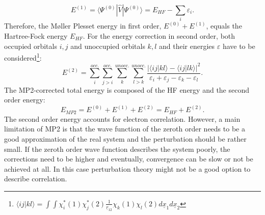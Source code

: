 \documentclass[11pt,DIV=13,BCOR=5mm,a4paper,headinclude]{scrbook}
\renewcommand{\vec}[1]{\underline{#1}}
\begin{document}
\begin{equation}
 E^{(1)} = \langle\Psi^{(0)}|\hat{V}|\Psi^{(0)}\rangle=E_{HF}-\sum_i \varepsilon_i.
\end{equation}
Therefore, the M\o{}ller Plesset energy in first order, $E^{(0)}+E^{(1)}$, equals the Hartree-Fock energy $E_{HF}$.
For the energy correction in second order, both occupied orbitals $i,j$ and unoccupied orbitals $k,l$ and their energies $\varepsilon$ have to be considered\footnote{$\langle ij|kl\rangle=\int\int\chi^\ast_i(1)\chi^\ast_j(2)\frac{1}{\vec{r}_{12}}\chi_k(1)\chi_l(2) d\vec{x}_1d\vec{x}_2$}:
\begin{equation}
 E^{(2)}=\sum\limits_{i}^{occ.}\sum\limits_{j>i}^{occ.}\sum\limits_{k}^{unocc.}\sum\limits_{l>k}^{unocc.} \frac{|\langle ij|kl\rangle - \langle ij|lk\rangle|^2}{\varepsilon_i + \varepsilon_j - \varepsilon_k - \varepsilon_l}.
\end{equation}
The MP2-corrected total energy is composed of the HF energy and the second order energy:
\begin{equation}
 E_{MP2} = E^{(0)}+E^{(1)} + E^{(2)} = E_{HF} + E^{(2)}.
\end{equation}
The second order energy accounts for electron correlation.
However, a main limitation of MP2 is that the wave function of the zeroth order needs to be a good approximation of the real system and the perturbation should be rather small.
If the zeroth order wave function describes the system poorly, the corrections need to be higher and eventually, convergence can be slow or not be achieved at all.
In this case perturbation theory might not be a good option to describe correlation.

\end{document}
